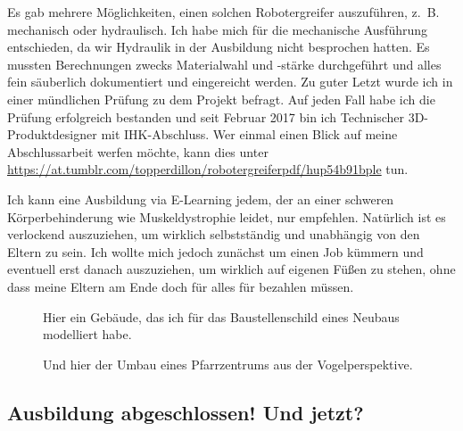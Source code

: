 \documentclass[fontsize=14pt,a4paper,headinclude,DIV=calc,automark]{scrbook}
\begin{document}
Es gab mehrere Möglichkeiten, einen solchen Robotergreifer auszuführen, z. B. mechanisch oder hydraulisch. Ich habe mich für die mechanische Ausführung entschieden, da wir Hydraulik in der Ausbildung nicht besprochen hatten. Es mussten Berechnungen zwecks Materialwahl und -stärke durchgeführt und alles fein säuberlich dokumentiert und eingereicht werden. Zu guter Letzt wurde ich in einer mündlichen Prüfung zu dem Projekt befragt. Auf jeden Fall habe ich die Prüfung erfolgreich bestanden und seit Februar 2017 bin ich Technischer 3D-Produktdesigner mit IHK-Abschluss. Wer einmal einen Blick auf meine Abschlussarbeit werfen möchte, kann dies unter \url{https://at.tumblr.com/topperdillon/robotergreiferpdf/hup54b91bple} tun.

Ich kann eine Ausbildung via E-Learning jedem, der an einer schweren Körperbehinderung wie Muskeldystrophie leidet, nur empfehlen. Natürlich ist es verlockend auszuziehen, um wirklich selbstständig und unabhängig von den Eltern zu sein. Ich wollte mich jedoch zunächst um einen Job kümmern und eventuell erst danach auszuziehen, um wirklich auf eigenen Füßen zu stehen, ohne dass meine Eltern am Ende doch für alles für bezahlen müssen.

\setlength{\fboxsep}{0pt}    %
\setlength{\fboxrule}{0.2pt} %
\begin{figure}[H]
    \raggedright
    \caption{Hier ein Gebäude, das ich für das Baustellenschild eines Neubaus modelliert habe.}
    \label{fig:baustellenschild}
\end{figure}

\setlength{\fboxsep}{0pt}    %
\setlength{\fboxrule}{0.2pt} %
\begin{figure}[H]
    \raggedright
    \caption{Und hier der Umbau eines Pfarrzentrums aus der Vogelperspektive.}
    \label{fig:pfarrzentrum}
\end{figure}

\subsection{Ausbildung abgeschlossen! Und jetzt?}
\end{document}
